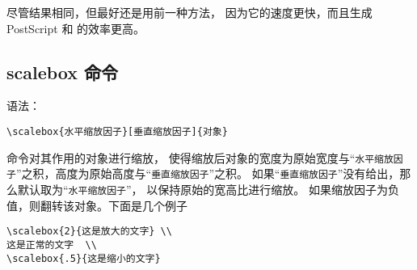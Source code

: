 尽管结果相同，但最好还是用前一种方法，
因为它的速度更快，而且生成 PostScript 和  的效率更高。

\subsection{scalebox 命令}\label{ssec:scalebox}
语法：
\begin{lstlisting}
\scalebox{水平缩放因子}[垂直缩放因子]{对象}
\end{lstlisting}

 命令对其作用的对象进行缩放，
使得缩放后对象的宽度为原始宽度与“\texttt{水平缩放因子}”之积，高度为原始高度与“\texttt{垂直缩放因子}”之积。
如果“\texttt{垂直缩放因子}”没有给出，那么默认取为“\texttt{水平缩放因子}”，
以保持原始的宽高比进行缩放。
如果缩放因子为负值，则翻转该对象。下面是几个例子

\begin{center}
\begin{minipage}[b]{.5\textwidth}
	\begin{center}
	\end{center}
	\par\vspace{0pt}
\end{minipage}%
\begin{minipage}[b]{.5\textwidth}
\begin{lstlisting}
\scalebox{2}{这是放大的文字} \\
这是正常的文字  \\
\scalebox{.5}{这是缩小的文字}
\end{lstlisting}
\par\vspace{0pt}
\end{minipage}
\end{center}


